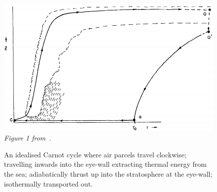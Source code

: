 \begin{figure}
\centering
    \includegraphics[width=\linewidth]{images/hurricane-carnot.png}\\
    \textit{Figure 1 from~\cite{emanuel1991theory}. }
    \caption{An idealised Carnot cycle where air parcels travel clockwise;
            travelling inwards into the eye-wall extracting thermal energy
            from the sea; adiabatically thrust up into the stratosphere
            at the eye-wall; isothermally transported out. }
            \label{fig:hurricane-carnot}

\end{figure}
